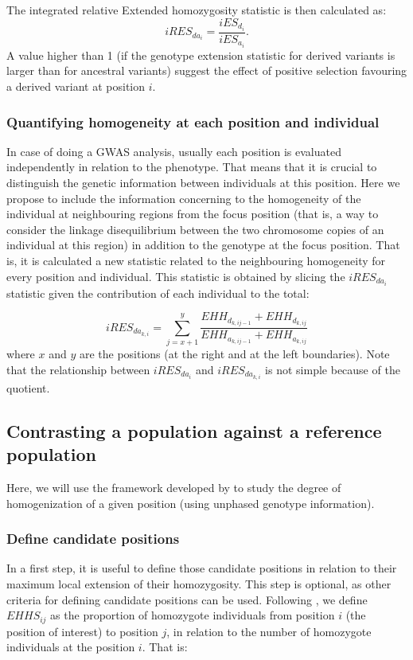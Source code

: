 \documentclass[a4paper,11pt]{article}
\begin{document}
The integrated relative Extended homozygosity statistic is then calculated as:
 \begin{equation}
 iRES_{da_{i}} = \frac{iES_{d_{i}}} {iES_{a_{i}}}.
 \end{equation}
A value higher than 1 (if the genotype extension statistic for derived variants is larger than for ancestral variants) suggest the effect of positive selection favouring a derived variant at position $i$.  

\subsubsection{Quantifying homogeneity at each position and individual}
In case of doing a GWAS analysis, usually each position is evaluated independently in relation to the phenotype. That means that it is crucial to distinguish the genetic information between individuals at this position. Here we propose to include the information concerning to the homogeneity of the individual at neighbouring regions from the focus position (that is, a way to consider the linkage disequilibrium between the two chromosome copies of an individual at this region) in addition to the genotype at the focus position. That is, it is calculated a new statistic related to the neighbouring homogeneity for every position and individual. This statistic is obtained by slicing the $iRES_{da_i}$ statistic given the contribution of each individual to the total:

 \begin{equation}
 iRES_{da_{k,i}} = \sum_{j=x+1}^{y} \frac{EHH_{d_{k,ij-1}}+ EHH_{d_{k,ij}}}  {{EHH_{a_{k,ij-1}}+ EHH_{a_{k,ij}}}}
 \end{equation}
where $x$ and $y$ are the positions (at the right and at the left boundaries). Note that the relationship between $iRES_{da_{i}}$ and $iRES_{da_{k,i}}$ is not simple because of the quotient.

\subsection{Contrasting a population against a reference population}
Here, we will use the framework developed by \cite{Tang:2007by} to study the degree of homogenization of a given position (using unphased genotype information).
\subsubsection{Define candidate positions}
 In a first step, it is useful to define those candidate positions in relation to their maximum local extension of their homozygosity. This step is optional, as other criteria for defining candidate positions can be used. Following \cite{Tang:2007by}, we define $EHHS_{ij}$ as the proportion of homozygote individuals from position $i$ (the position of interest) to position $j$, in relation to the number of homozygote individuals at the position $i$. That is:
 
\end{document}
